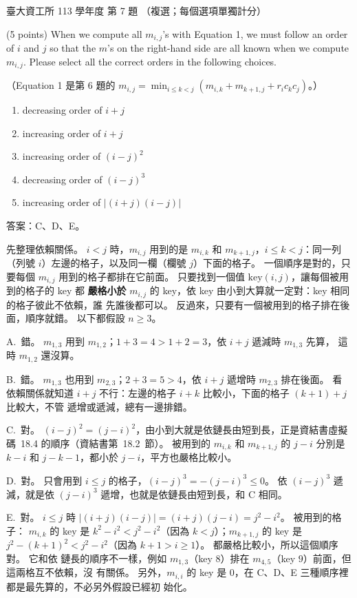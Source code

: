 \begin{pastexam}[label={px:ntu-113-dsa-07}]{臺大資工所 113 學年度 第 7 題}
（複選；每個選項單獨計分）

(5 points) When we compute all $m_{i,j}$'s with Equation 1, we must follow an order of $i$ and $j$ so
that the $m$'s on the right-hand side are all known when we compute $m_{i,j}$. Please select all the
correct orders in the following choices.

（Equation 1 是第 6 題的 $m_{i,j}=\min_{i\le k<j}(m_{i,k}+m_{k+1,j}+r_ic_kc_j)$。）
\begin{enumerate}[label=\Alph*.]
\item decreasing order of $i+j$
\item increasing order of $i+j$
\item increasing order of $(i-j)^2$
\item decreasing order of $(i-j)^3$
\item increasing order of $|(i+j)(i-j)|$
\end{enumerate}
\end{pastexam}

\begin{pastsoln}
答案：C、D、E。

先整理依賴關係。 $i < j$ 時，$m_{i,j}$ 用到的是 $m_{i,k}$ 和 $m_{k+1,j}$，$i \le k < j$：同一列
（列號 $i$）左邊的格子，以及同一欄（欄號 $j$）下面的格子。 一個順序是對的，只要每個 $m_{i,j}$
用到的格子都排在它前面。 只要找到一個值 $\mathrm{key}(i, j)$，讓每個被用到的格子的 key 都
\textbf{嚴格小於} $m_{i,j}$ 的 key，依 key 由小到大算就一定對：key 相同的格子彼此不依賴，誰
先誰後都可以。 反過來，只要有一個被用到的格子排在後面，順序就錯。 以下都假設 $n \ge 3$。

A.\ 錯。 $m_{1,3}$ 用到 $m_{1,2}$；$1 + 3 = 4 > 1 + 2 = 3$，依 $i + j$ 遞減時 $m_{1,3}$ 先算，
這時 $m_{1,2}$ 還沒算。

B.\ 錯。 $m_{1,3}$ 也用到 $m_{2,3}$；$2 + 3 = 5 > 4$，依 $i + j$ 遞增時 $m_{2,3}$ 排在後面。 看
依賴關係就知道 $i + j$ 不行：左邊的格子 $i + k$ 比較小，下面的格子 $(k + 1) + j$ 比較大，不管
遞增或遞減，總有一邊排錯。

C.\ 對。 $(i - j)^2 = (j - i)^2$，由小到大就是依鏈長由短到長，正是資結書虛擬碼~18.4
的順序（資結書第~18.2~節）。 被用到的 $m_{i,k}$ 和 $m_{k+1,j}$ 的 $j - i$ 分別是
$k - i$ 和 $j - k - 1$，都小於 $j - i$，平方也嚴格比較小。

D.\ 對。 只會用到 $i \le j$ 的格子，$(i - j)^3 = -(j - i)^3 \le 0$。 依 $(i - j)^3$ 遞減，就是依
$(j - i)^3$ 遞增，也就是依鏈長由短到長，和 C 相同。

E.\ 對。 $i \le j$ 時 $|(i + j)(i - j)| = (i + j)(j - i) = j^2 - i^2$。 被用到的格子：
$m_{i,k}$ 的 key 是 $k^2 - i^2 < j^2 - i^2$（因為 $k < j$）；$m_{k+1,j}$ 的 key 是
$j^2 - (k + 1)^2 < j^2 - i^2$（因為 $k + 1 > i \ge 1$）。 都嚴格比較小，所以這個順序對。 它和依
鏈長的順序不一樣，例如 $m_{1,3}$（key $8$）排在 $m_{4,5}$（key $9$）前面，但這兩格互不依賴，沒
有關係。 另外，$m_{i,i}$ 的 key 是 $0$，在 C、D、E 三種順序裡都是最先算的，不必另外假設已經初
始化。
\end{pastsoln}
